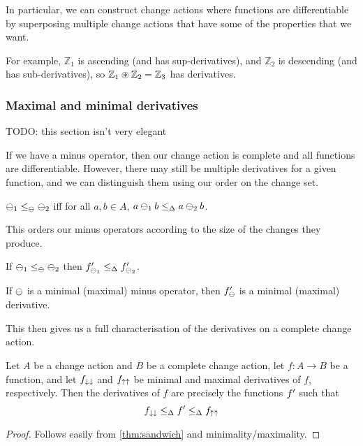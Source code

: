 In particular, we can construct change actions where functions are
differentiable by superposing multiple change actions that have some of the
properties that we want.

For example, $\mathbb{Z}_1$ is ascending (and has sup-derivatives), and
$\mathbb{Z}_2$ is descending (and has sub-derivatives), so $\mathbb{Z}_1
\circledast \mathbb{Z}_2 = \mathbb{Z}_3$ has derivatives.

\subsubsection{Maximal and minimal derivatives}

TODO: this section isn't very elegant

If we have a minus operator, then our change action is complete and all
functions are differentiable. However, there may still be multiple derivatives
for a given function, and we can distinguish them using our order on the change
set.

\begin{defn}
  $\ominus_1 \leq_\ominus \ominus_2$ iff for all $a,b \in A$, $a \ominus_1 b
  \leq_\Delta a \ominus_2 b$.
\end{defn}

This orders our minus operators according to the size of the changes they
produce. 

\begin{prop}
  If $\ominus_1 \leq_\ominus \ominus_2$ then
  $f'_{\ominus_1} \leq_\Delta f'_{\ominus_2}$.
\end{prop}

\begin{prop}
  If $\ominus$ is a minimal (maximal) minus operator, then $f'_\ominus$
  is a minimal (maximal) derivative.
\end{prop}

This then gives us a full characterisation of the derivatives on a complete
change action.

\begin{thm}
\label{thm:derivativeCharacterization}
  Let $A$ be a change action and $B$ be a complete change action, let
  $f: A \rightarrow B$ be a function, and let $f_{\downarrow\downarrow}$ and
  $f_{\uparrow\uparrow}$ be minimal and maximal derivatives of $f$, respectively.
  Then the derivatives of $f$ are precisely
  the functions $f'$ such that
  $$f_{\downarrow\downarrow} \leq_\Delta f' \leq_\Delta f_{\uparrow\uparrow}$$
\end{thm}
\begin{proof}
  Follows easily from \cref{thm:sandwich} and minimality/maximality.
\end{proof}

